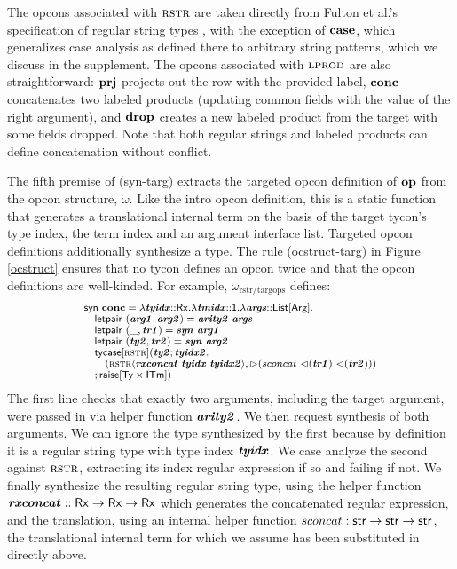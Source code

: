 \documentclass[10pt,preprint]{sigplanconf}
\begin{document}
The opcons associated with $\textsc{rstr}$ are taken directly from Fulton et al.'s specification of regular string types \cite{sanitation-psp14}, with the exception of $\textbf{case}$, which generalizes case analysis as defined there to arbitrary string patterns, which we discuss in the supplement. The opcons associated with $\textsc{lprod}$ are also straightforward: $\textbf{prj}$ projects out the row with the provided label, $\textbf{conc}$ concatenates two labeled products (updating common fields with the value of the right argument), and $\textbf{drop}$ creates a new labeled product from the target with some fields dropped. Note that both regular strings and labeled products can define concatenation without conflict. %

The fifth premise of (syn-targ) extracts the targeted opcon definition of $\textbf{op}$ from the opcon structure, $\omega$. Like the intro opcon definition, this is a static function that generates a translational internal term on the basis of the target tycon's type index, the term index and an argument interface list. Targeted opcon definitions additionally synthesize a type. The rule (ocstruct-targ) in Figure \ref{ocstruct} ensures that no tycon defines an opcon twice and that the opcon definitions are well-kinded. 
For example, $\omega_\text{rstr/targops}$ defines:
\[\small
\begin{array}{l}
\keyw{syn}~\opname{conc}=\slam{\krx}{\svar{tyidx}}{
    \slam{\kunit}{\svar{tmidx}}{
        \slam{\kargs}{\svar{args}}{\\
            \quad \keyw{letpair}~(\svar{arg1}, \svar{arg2}) = \svar{arity2}~\svar{args}\\
            \quad \keyw{letpair}~(\_, \svar{tr1}) = \svar{syn}~\svar{arg1}\\
            \quad \keyw{letpair}~(\svar{ty2}, \svar{tr2}) = \svar{syn}~\svar{arg2}\\
            \quad \stycase{\tcvar{rstr}}{\svar{ty2}}{\svar{tyidx2}}{\\
                \quad\quad (\sty{\tcvar{rstr}}{\svar{rxconcat}~\svar{tyidx}~\svar{tyidx2}}, \sqitm{sconcat~\quq{\svar{tr1}}~\quq{\svar{tr2}}})\\
                \quad
            }{\sraise{\kty\times\kitm}}
        }
    }
}
\end{array}
\]
The first line checks that exactly two arguments, including the target argument, were passed in via helper function ${\textbf{\textit{arity2}}}$. We then request synthesis of both arguments. We can ignore the type synthesized by the first because by definition it is a regular string type with type index ${\textbf{\textit{tyidx}}}$. We case analyze the second against $\textsc{rstr}$, extracting its index regular expression if so and failing if not. We finally synthesize the resulting regular string type, using the helper function ${\textbf{\textit{rxconcat}}} :: {\sf Rx} \rightarrow {\sf Rx} \rightarrow {\sf Rx}$ which generates the concatenated regular expression, and the translation, using an internal helper function $sconcat : {\sf str} \rightarrow {\sf str} \rightarrow {\sf str}$, the translational internal term for which we assume has been substituted in directly above.
\end{document}
